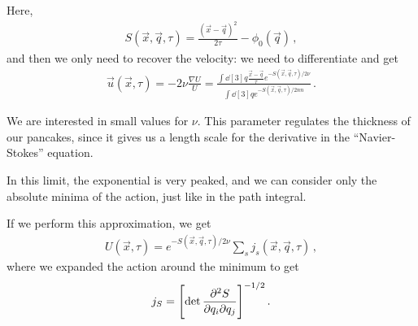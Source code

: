 \documentclass[main.tex]{subfiles}
\begin{document}
Here, 
%
\begin{align}
S(\vec{x}, \vec{q}, \tau ) = \frac{(\vec{x} - \vec{q})^2}{2 \tau } - \phi_0 (\vec{q})
\,,
\end{align}
%
and then we only need to recover the velocity: we need to differentiate and get 
%
\begin{align}
\vec{u} (\vec{x}, \tau ) = - 2 \nu \frac{\nabla U }{U }
= \frac{ \int \dd[3]{q}\frac{\vec{x} - \vec{q}}{\tau } e^{- S(\vec{x}, \vec{q}, \tau ) / 2 \nu }}{ \int \dd[3]{q} e^{- S (\vec{x}, \vec{q}, \tau ) / 2 nn}}
\,.
\end{align}

We are interested in small values for \(\nu \). This parameter regulates the thickness of our pancakes, since it gives us a length scale for the derivative in the ``Navier-Stokes'' equation.

In this limit, the exponential is very peaked, and we can consider only the absolute minima of the action, just like in the path integral. 

If we perform this approximation, we get 
%
\begin{align}
U(\vec{x}, \tau ) = e^{ - S(\vec{x}, \vec{q}, \tau )  / 2 \nu } \sum _{s} j_s (\vec{x}, \vec{q}, \tau )
\,,
\end{align}
%
where we expanded the action around the minimum to get 
%
\begin{align}
j_S = \qty[\det \pdv[2]{S}{q_{i}}{q_{j}}]^{- 1/2}
\,.
\end{align}
\end{document}
